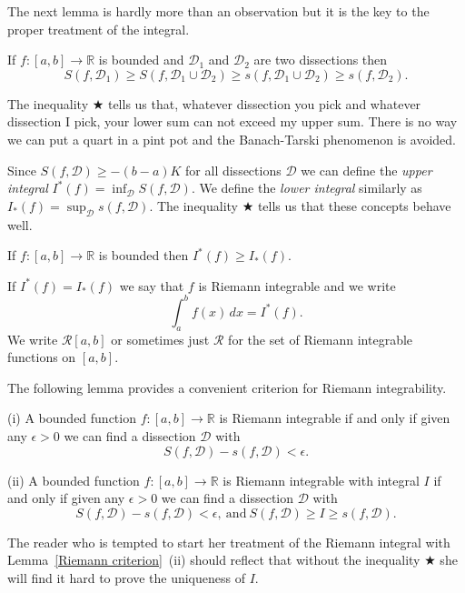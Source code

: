 The next lemma is hardly more than an observation
but it is the key to the proper treatment of the integral.
\begin{lemma} If
$f:[a,b]\rightarrow{\mathbb R}$
is bounded and
$\mathcal{D}_{1}$ and $\mathcal{D}_{2}$ are two dissections
then
\begin{equation*}
S(f,\mathcal{D}_{1})\geq S(f,\mathcal{D}_{1}\cup\mathcal{D}_{2})
\geq
s(f,\mathcal{D}_{1}\cup\mathcal{D}_{2})\geq s(f,\mathcal{D}_{2}).
\tag*{$\bigstar$}
\end{equation*}
\end{lemma}
The inequality $\bigstar$ tells us that, whatever dissection
you pick and whatever dissection I pick, your lower
sum can not exceed my upper sum. There is no way we
can put a quart in a pint pot and the Banach-Tarski
phenomenon is avoided.


Since $S(f,\mathcal{D})\geq -(b-a)K$
for all dissections $\mathcal{D}$
we can define the \emph{upper integral}
$I^{*}(f)=\inf_{\mathcal{D}}S(f,\mathcal{D})$.
We define the \emph{lower integral} similarly
as $I_{*}(f)=\sup_{\mathcal{D}}s(f,\mathcal{D})$.
The inequality $\bigstar$ tells us that these
concepts behave well.
\begin{lemma} If $f:[a,b]\rightarrow{\mathbb R}$
is bounded then $I^{*}(f)\geq I_{*}(f)$.
\end{lemma}
If $I^{*}(f)=I_{*}(f)$ we say that $f$ is Riemann
integrable and we write
\[\int_{a}^{b}f(x)\,dx=I^{*}(f).\]
We write $\mathcal{R}[a,b]$ or sometimes
just $\mathcal{R}$ for the set of Riemann integrable
functions on $[a,b]$.

The following lemma provides a convenient criterion
for Riemann integrability.
\begin{lemma}\label{Riemann criterion}
(i) A bounded function
$f:[a,b]\rightarrow{\mathbb R}$ is Riemann integrable
if and only if given any $\epsilon>0$ we can find
a dissection ${\mathcal D}$ with
\[S(f,{\mathcal D})-s(f,{\mathcal D})<\epsilon.\]

(ii) A bounded function
$f:[a,b]\rightarrow{\mathbb R}$ is Riemann integrable
with integral $I$
if and only if given any $\epsilon>0$ we can find
a dissection ${\mathcal D}$ with
\[S(f,{\mathcal D})-s(f,{\mathcal D})<\epsilon,
\ \text{and}\ S(f,{\mathcal D})\geq I\geq s(f,{\mathcal D}).\]
\end{lemma}
The reader who is tempted to start her treatment of
the Riemann integral with Lemma~\ref{Riemann criterion}~(ii)
should reflect that without the inequality $\bigstar$
she will find it hard to prove the uniqueness of $I$.

